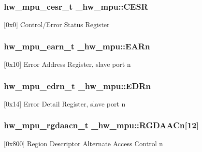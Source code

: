 \subsubsection[{\texorpdfstring{C\+E\+SR}{CESR}}]{ {\bf hw\+\_\+mpu\+\_\+cesr\+\_\+t} \+\_\+hw\+\_\+mpu\+::\+C\+E\+SR}\hypertarget{struct__hw__mpu_a83c6bacc5ab8f9f538ece7a9c91e53a2}{}\label{struct__hw__mpu_a83c6bacc5ab8f9f538ece7a9c91e53a2}
\mbox{[}0x0\mbox{]} Control/\+Error Status Register 
\subsubsection[{\texorpdfstring{E\+A\+Rn}{EARn}}]{ {\bf hw\+\_\+mpu\+\_\+earn\+\_\+t} \+\_\+hw\+\_\+mpu\+::\+E\+A\+Rn}\hypertarget{struct__hw__mpu_a6b4b39a1b2df6b57373e48d48da53568}{}\label{struct__hw__mpu_a6b4b39a1b2df6b57373e48d48da53568}
\mbox{[}0x10\mbox{]} Error Address Register, slave port n 
\subsubsection[{\texorpdfstring{E\+D\+Rn}{EDRn}}]{ {\bf hw\+\_\+mpu\+\_\+edrn\+\_\+t} \+\_\+hw\+\_\+mpu\+::\+E\+D\+Rn}\hypertarget{struct__hw__mpu_a31c5e39c6a3c3dad8878f46826be4781}{}\label{struct__hw__mpu_a31c5e39c6a3c3dad8878f46826be4781}
\mbox{[}0x14\mbox{]} Error Detail Register, slave port n 
\subsubsection[{\texorpdfstring{R\+G\+D\+A\+A\+Cn}{RGDAACn}}]{ {\bf hw\+\_\+mpu\+\_\+rgdaacn\+\_\+t} \+\_\+hw\+\_\+mpu\+::\+R\+G\+D\+A\+A\+Cn\mbox{[}12\mbox{]}}\hypertarget{struct__hw__mpu_a249eb31334ca0ca19e0abd3fe04215e2}{}\label{struct__hw__mpu_a249eb31334ca0ca19e0abd3fe04215e2}
\mbox{[}0x800\mbox{]} Region Descriptor Alternate Access Control n 

